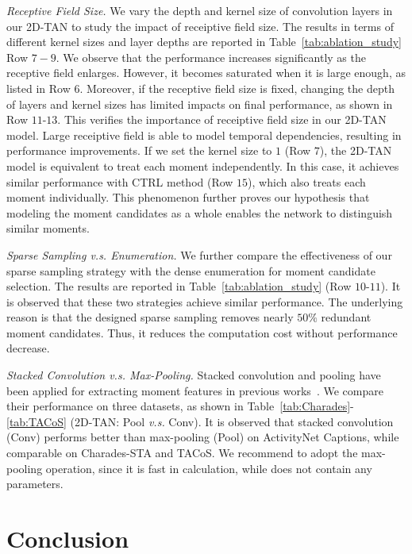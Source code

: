 \documentclass[letterpaper]{article} %
\begin{document}
\textit{Receptive Field Size. } We vary the depth and kernel size of convolution layers in our 2D-TAN to study the impact of receiptive field size.
The results in terms of different kernel sizes and layer depths are reported in Table~\ref{tab:ablation_study} Row $7-9$.
We observe that the performance increases significantly as the receptive field enlarges.
However, it becomes saturated when it is large enough, as listed in Row $6$.
Moreover, if the receptive field size is fixed, changing the depth of layers and kernel sizes has limited impacts on final performance, as shown in Row $11$-$13$.
\vspace{-4.73mm}
This verifies the importance of receiptive field size in our 2D-TAN model. Large receiptive field is able to model temporal dependencies, resulting in performance improvements.
If we set the kernel size to $1$ (Row $7$), the 2D-TAN model is equivalent to treat each moment independently. In this case, it achieves similar performance with CTRL method (Row $15$), which also treats each moment individually.
This phenomenon further proves our hypothesis that modeling the moment candidates as a whole enables the network to distinguish similar moments.

\vspace{-0.91mm}
\textit{Sparse Sampling \emph{v.s.} Enumeration.}
We further compare the effectiveness of our sparse sampling strategy with the dense enumeration for moment candidate selection. The results are reported in Table~\ref{tab:ablation_study} (Row $10$-$11$). It is observed that these two strategies achieve similar performance. The underlying reason is that the designed sparse sampling removes nearly $50\%$ redundant moment candidates. Thus, it reduces the computation cost without performance decrease.

\textit{Stacked Convolution \emph{v.s.} Max-Pooling.}
Stacked convolution and pooling have been applied for extracting moment features in previous works~\cite{hendricks17iccv,zhang2019man}.
We compare their performance on three datasets, as  shown in Table~\ref{tab:Charades}-\ref{tab:TACoS} (2D-TAN: Pool \emph{v.s.} Conv).
It is observed that stacked convolution (Conv) performs better than max-pooling (Pool) on ActivityNet Captions, while comparable on Charades-STA and TACoS. We recommend to adopt the max-pooling operation, since it is fast in calculation, while does not contain any parameters.

\vspace{-3.23mm}
\section{Conclusion}
\end{document}
